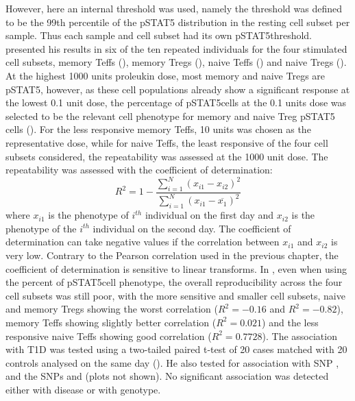 However, here an internal threshold was used, namely the threshold was defined to be the 99th percentile of the pSTAT5 distribution in the resting cell subset per sample.
Thus each sample and cell subset had its own pSTAT5\positive threshold.
 presented his results in six of the ten repeated individuals for the four stimulated cell subsets, memory Teffs (), memory Tregs (), naive Teffs () and naive Tregs ().
At the highest 1000 units proleukin dose, most memory and naive Tregs are pSTAT5\positive, however, as these cell populations already show a significant response at the lowest 0.1 unit dose, the percentage of pSTAT5\positive cells at the 0.1 units dose was selected to be the relevant cell phenotype for memory and naive Treg pSTAT5 cells ().
For the less responsive memory Teffs, 10 units was chosen as the representative dose, while for naive Teffs, the least responsive of the four cell subsets considered, the repeatability was assessed at the 1000 unit dose.
The repeatability was assessed with the coefficient of determination:
\[
  R^2 = 1 - \frac{\sum_{i=1}^N (x_{i1}-x_{i2})^2}{\sum_{i=1}^N (x_{i1}-\overline{x_1})^2}
\]
where $x_{i1}$ is the phenotype of $i^{th}$ individual on the first day and $x_{i2}$
is the phenotype of the $i^{th}$ individual on the second day.
The coefficient of determination can take negative values if the correlation between $x_{i1}$ and $x_{i2}$ is very low.
Contrary to the Pearson correlation used in the previous chapter, the coefficient of determination is sensitive to linear transforms.
In , even when using the percent of pSTAT5\positive cell phenotype, the overall reproducibility across the four cell subsets was still poor, with the more sensitive and smaller cell subsets, naive and memory Tregs showing the worst correlation ($R^2=-0.16$ and $R^2=-0.82$), memory Teffs showing slightly better correlation ($R^2=0.021$) and the less responsive naive Teffs showing good correlation ($R^2=0.7728$).
The association with \gls{T1D} was tested using a two-tailed paired t-test of 20 cases matched with 20 controls analysed on the same day ().
He also tested for association with  SNP , and the  SNPs  and  (plots not shown).
No significant association was detected either with disease or with genotype.


